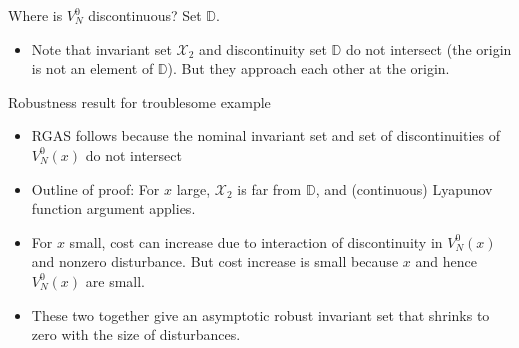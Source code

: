\documentclass{beamer}
\newcommand{\bbD}{\mathbb{D}}
\begin{document}
\begin{frame}{Where is $V_N^0$ discontinuous? Set $\bbD$.}


\centerline{\resizebox{0.75\textwidth}{!}{}}
\begin{itemize}

\item Note that invariant set $\mathcal{X}_2$ and discontinuity set
  $\bbD$   do not intersect (the origin is not an element of
  $\bbD$). But they approach each other at the origin.
\end{itemize}
\end{frame}

\begin{frame}{Robustness result for troublesome example}

\begin{block}{}
\begin{itemize}
\item RGAS follows because the nominal invariant set and set of
  discontinuities of $V_N^0(x)$ do not intersect

\item Outline of proof: For $x$ large, $\mathcal{X}_2$ is far from
  $\bbD$, and (continuous) Lyapunov function argument applies. 

\item For $x$ small, cost \alert{can increase} due to interaction of
  discontinuity in $V_N^0(x)$ and nonzero disturbance. But cost
  increase is small because $x$ and hence $V_N^0(x)$ are  small.

\item These two together give an asymptotic robust invariant set that shrinks to
  zero with the size of disturbances.
\end{itemize}
\end{block}

\end{frame}
\end{document}
